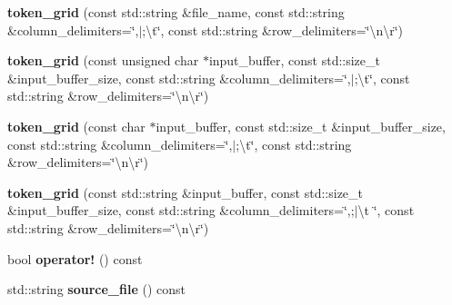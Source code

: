 \begin{DoxyCompactItemize}
\item 
\hypertarget{classstrtk_1_1token__grid_ad59fab2d58ba1c7096a26f378d394b39}{{\bfseries token\-\_\-grid} (const std\-::string \&file\-\_\-name, const std\-::string \&column\-\_\-delimiters=\char`\"{},$\vert$;\textbackslash{}t\char`\"{}, const std\-::string \&row\-\_\-delimiters=\char`\"{}\textbackslash{}n\textbackslash{}r\char`\"{})}\label{classstrtk_1_1token__grid_ad59fab2d58ba1c7096a26f378d394b39}

\item 
\hypertarget{classstrtk_1_1token__grid_a29ec64793c4d7cb3edcdee396b3d514b}{{\bfseries token\-\_\-grid} (const unsigned char $\ast$input\-\_\-buffer, const std\-::size\-\_\-t \&input\-\_\-buffer\-\_\-size, const std\-::string \&column\-\_\-delimiters=\char`\"{},$\vert$;\textbackslash{}t\char`\"{}, const std\-::string \&row\-\_\-delimiters=\char`\"{}\textbackslash{}n\textbackslash{}r\char`\"{})}\label{classstrtk_1_1token__grid_a29ec64793c4d7cb3edcdee396b3d514b}

\item 
\hypertarget{classstrtk_1_1token__grid_a7160ee6c5abd8987da1ef08d1de6f2da}{{\bfseries token\-\_\-grid} (const char $\ast$input\-\_\-buffer, const std\-::size\-\_\-t \&input\-\_\-buffer\-\_\-size, const std\-::string \&column\-\_\-delimiters=\char`\"{},$\vert$;\textbackslash{}t\char`\"{}, const std\-::string \&row\-\_\-delimiters=\char`\"{}\textbackslash{}n\textbackslash{}r\char`\"{})}\label{classstrtk_1_1token__grid_a7160ee6c5abd8987da1ef08d1de6f2da}

\item 
\hypertarget{classstrtk_1_1token__grid_a02089cdcbad71bdb747b2e30803d9250}{{\bfseries token\-\_\-grid} (const std\-::string \&input\-\_\-buffer, const std\-::size\-\_\-t \&input\-\_\-buffer\-\_\-size, const std\-::string \&column\-\_\-delimiters=\char`\"{},;$\vert$\textbackslash{}t \char`\"{}, const std\-::string \&row\-\_\-delimiters=\char`\"{}\textbackslash{}n\textbackslash{}r\char`\"{})}\label{classstrtk_1_1token__grid_a02089cdcbad71bdb747b2e30803d9250}

\item 
\hypertarget{classstrtk_1_1token__grid_a8c2bd5d10669d54be9737f3fc1617c7a}{bool {\bfseries operator!} () const }\label{classstrtk_1_1token__grid_a8c2bd5d10669d54be9737f3fc1617c7a}

\item 
\hypertarget{classstrtk_1_1token__grid_a2219f5a94d7bd0039d3940daa67d9702}{std\-::string {\bfseries source\-\_\-file} () const }\label{classstrtk_1_1token__grid_a2219f5a94d7bd0039d3940daa67d9702}


\end{DoxyCompactItemize}
